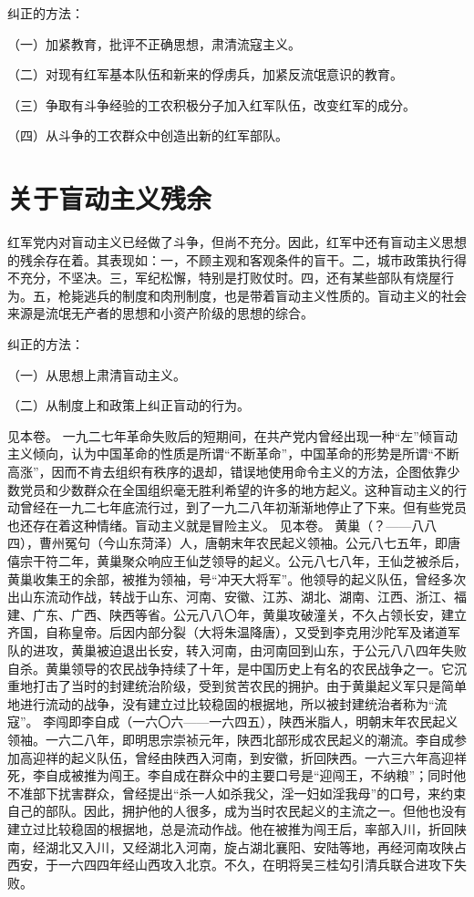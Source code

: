纠正的方法：

（一）加紧教育，批评不正确思想，肃清流寇主义。

（二）对现有红军基本队伍和新来的俘虏兵，加紧反流氓意识的教育。

（三）争取有斗争经验的工农积极分子加入红军队伍，改变红军的成分。

（四）从斗争的工农群众中创造出新的红军部队。

\section{关于盲动主义残余}

红军党内对盲动主义已经做了斗争，但尚不充分。因此，红军中还有盲动主义思想的残余存在着。其表现如：一，不顾主观和客观条件的盲干。二，城市政策执行得不充分，不坚决。三，军纪松懈，特别是打败仗时。四，还有某些部队有烧屋行为。五，枪毙逃兵的制度和肉刑制度，也是带着盲动主义性质的。盲动主义的社会来源是流氓无产者的思想和小资产阶级的思想的综合。

纠正的方法：

（一）从思想上肃清盲动主义。

（二）从制度上和政策上纠正盲动的行为。


\begin{maonote}
见本卷。
一九二七年革命失败后的短期间，在共产党内曾经出现一种“左”倾盲动主义倾向，认为中国革命的性质是所谓“不断革命”，中国革命的形势是所谓“不断高涨”，因而不肯去组织有秩序的退却，错误地使用命令主义的方法，企图依靠少数党员和少数群众在全国组织毫无胜利希望的许多的地方起义。这种盲动主义的行动曾经在一九二七年底流行过，到了一九二八年初渐渐地停止了下来。但有些党员也还存在着这种情绪。盲动主义就是冒险主义。
见本卷。
黄巢（？——八八四），曹州冤句（今山东菏泽）人，唐朝末年农民起义领袖。公元八七五年，即唐僖宗干符二年，黄巢聚众响应王仙芝领导的起义。公元八七八年，王仙芝被杀后，黄巢收集王的余部，被推为领袖，号“冲天大将军”。他领导的起义队伍，曾经多次出山东流动作战，转战于山东、河南、安徽、江苏、湖北、湖南、江西、浙江、福建、广东、广西、陕西等省。公元八八〇年，黄巢攻破潼关，不久占领长安，建立齐国，自称皇帝。后因内部分裂（大将朱温降唐），又受到李克用沙陀军及诸道军队的进攻，黄巢被迫退出长安，转入河南，由河南回到山东，于公元八八四年失败自杀。黄巢领导的农民战争持续了十年，是中国历史上有名的农民战争之一。它沉重地打击了当时的封建统治阶级，受到贫苦农民的拥护。由于黄巢起义军只是简单地进行流动的战争，没有建立过比较稳固的根据地，所以被封建统治者称为“流寇”。
李闯即李自成（一六〇六——一六四五），陕西米脂人，明朝末年农民起义领袖。一六二八年，即明思宗崇祯元年，陕西北部形成农民起义的潮流。李自成参加高迎祥的起义队伍，曾经由陕西入河南，到安徽，折回陕西。一六三六年高迎祥死，李自成被推为闯王。李自成在群众中的主要口号是“迎闯王，不纳粮”；同时他不准部下扰害群众，曾经提出“杀一人如杀我父，淫一妇如淫我母”的口号，来约束自己的部队。因此，拥护他的人很多，成为当时农民起义的主流之一。但他也没有建立过比较稳固的根据地，总是流动作战。他在被推为闯王后，率部入川，折回陕南，经湖北又入川，又经湖北入河南，旋占湖北襄阳、安陆等地，再经河南攻陕占西安，于一六四四年经山西攻入北京。不久，在明将吴三桂勾引清兵联合进攻下失败。
\end{maonote}
